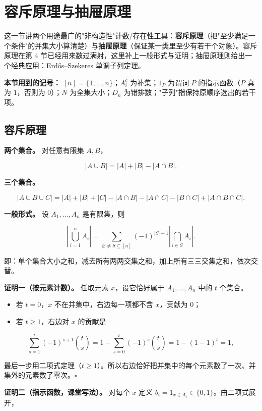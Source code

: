 \section{容斥原理与抽屉原理}


这一节讲两个用途最广的"非构造性"计数/存在性工具：\textbf{容斥原理}（把"至少满足一个条件"的并集大小算清楚）与\textbf{抽屉原理}（保证某一类里至少有若干个对象）。容斥原理在第 4 节已经用来数过满射，这里补上一般形式与证明；抽屉原理则给出一个经典应用：Erdős–Szekeres 单调子列定理。

\textbf{本节用到的记号：} $[n]=\{1,\dots,n\}$；$A_i^c$ 为补集；$1_{P}$ 为谓词 $P$ 的指示函数（$P$ 真为 $1$，否则为 $0$）；$N$ 为全集大小；$D_n$ 为错排数；"子列"指保持原顺序选出的若干项。

\subsection{容斥原理}


\textbf{两个集合。} 对任意有限集 $A,B$，

\[
|A\cup B|=|A|+|B|-|A\cap B|.
\]

\textbf{三个集合。}

\[
|A\cup B\cup C|=|A|+|B|+|C|-|A\cap B|-|A\cap C|-|B\cap C|+|A\cap B\cap C|.
\]

\textbf{一般形式。} 设 $A_1,\dots,A_n$ 是有限集，则

\[
\left|\bigcup_{i=1}^{n}A_i\right|
=\sum_{\varnothing\neq S\subseteq[n]}(-1)^{|S|+1}\left|\bigcap_{i\in S}A_i\right|.
\]

即：单个集合大小之和，减去所有两两交集之和，加上所有三三交集之和，依次交替。

\textbf{证明一（按元素计数）。} 任取元素 $x$，设它恰好属于 $A_1,\dots,A_n$ 中的 $t$ 个集合。

\begin{itemize}
\item 若 $t=0$，$x$ 不在并集中，右边每一项都不含 $x$，贡献为 $0$；
\item 若 $t\ge1$，右边对 $x$ 的贡献是
\end{itemize}


\[
\sum_{s=1}^{t}(-1)^{s+1}\binom ts=1-\sum_{s=0}^{t}(-1)^{s}\binom ts=1-(1-1)^t=1,
\]

最后一步用二项式定理（$t\ge1$）。所以右边恰好把并集中的每个元素数了一次、并集外的元素数了零次。$\square$

\textbf{证明二（指示函数，课堂写法）。} 对每个 $x$ 定义 $b_i=1_{x\in A_i}\in\{0,1\}$。由二项式展开，

